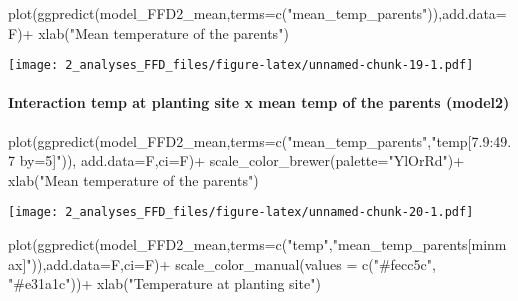 \documentclass[
]{article}
\newenvironment{Shaded}{\begin{snugshade}}{\end{snugshade}}
\newcommand{\AttributeTok}[1]{\textcolor[rgb]{0.77,0.63,0.00}{#1}}
\newcommand{\FunctionTok}[1]{\textcolor[rgb]{0.00,0.00,0.00}{#1}}
\newcommand{\NormalTok}[1]{#1}
\newcommand{\SpecialCharTok}[1]{\textcolor[rgb]{0.00,0.00,0.00}{#1}}
\newcommand{\StringTok}[1]{\textcolor[rgb]{0.31,0.60,0.02}{#1}}
\begin{document}
\begin{Shaded}
\begin{Highlighting}[]
\FunctionTok{plot}\NormalTok{(}\FunctionTok{ggpredict}\NormalTok{(model\_FFD2\_mean,}\AttributeTok{terms=}\FunctionTok{c}\NormalTok{(}\StringTok{"mean\_temp\_parents"}\NormalTok{)),}\AttributeTok{add.data=}\NormalTok{F)}\SpecialCharTok{+}
  \FunctionTok{xlab}\NormalTok{(}\StringTok{"Mean temperature of the parents"}\NormalTok{)}
\end{Highlighting}
\end{Shaded}

\texttt{[image: 2\_analyses\_FFD\_files/figure-latex/unnamed-chunk-19-1.pdf]}

\hypertarget{interaction-temp-at-planting-site-x-mean-temp-of-the-parents-model2}{%
\paragraph{Interaction temp at planting site x mean temp of the parents
(model2)}\label{interaction-temp-at-planting-site-x-mean-temp-of-the-parents-model2}}

\begin{Shaded}
\begin{Highlighting}[]
\FunctionTok{plot}\NormalTok{(}\FunctionTok{ggpredict}\NormalTok{(model\_FFD2\_mean,}\AttributeTok{terms=}\FunctionTok{c}\NormalTok{(}\StringTok{"mean\_temp\_parents"}\NormalTok{,}\StringTok{"temp[7.9:49.7 by=5]"}\NormalTok{)),}
     \AttributeTok{add.data=}\NormalTok{F,}\AttributeTok{ci=}\NormalTok{F)}\SpecialCharTok{+}
  \FunctionTok{scale\_color\_brewer}\NormalTok{(}\AttributeTok{palette=}\StringTok{"YlOrRd"}\NormalTok{)}\SpecialCharTok{+}
  \FunctionTok{xlab}\NormalTok{(}\StringTok{"Mean temperature of the parents"}\NormalTok{)}
\end{Highlighting}
\end{Shaded}

\texttt{[image: 2\_analyses\_FFD\_files/figure-latex/unnamed-chunk-20-1.pdf]}

\begin{Shaded}
\begin{Highlighting}[]
\FunctionTok{plot}\NormalTok{(}\FunctionTok{ggpredict}\NormalTok{(model\_FFD2\_mean,}\AttributeTok{terms=}\FunctionTok{c}\NormalTok{(}\StringTok{"temp"}\NormalTok{,}\StringTok{"mean\_temp\_parents[minmax]"}\NormalTok{)),}\AttributeTok{add.data=}\NormalTok{F,}\AttributeTok{ci=}\NormalTok{F)}\SpecialCharTok{+}
  \FunctionTok{scale\_color\_manual}\NormalTok{(}\AttributeTok{values =} \FunctionTok{c}\NormalTok{(}\StringTok{"\#fecc5c"}\NormalTok{, }\StringTok{"\#e31a1c"}\NormalTok{))}\SpecialCharTok{+}
  \FunctionTok{xlab}\NormalTok{(}\StringTok{"Temperature at planting site"}\NormalTok{)}
\end{Highlighting}
\end{Shaded}
\end{document}
